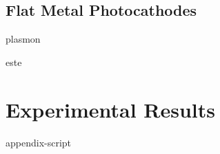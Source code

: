 \documentclass{uicthesi}
\begin{document}
\section{Flat Metal Photocathodes}

  {plasmon}

  {este}

\chapter{Experimental Results}

\appendix
  {appendix-script}

\newpage


\end{document}
